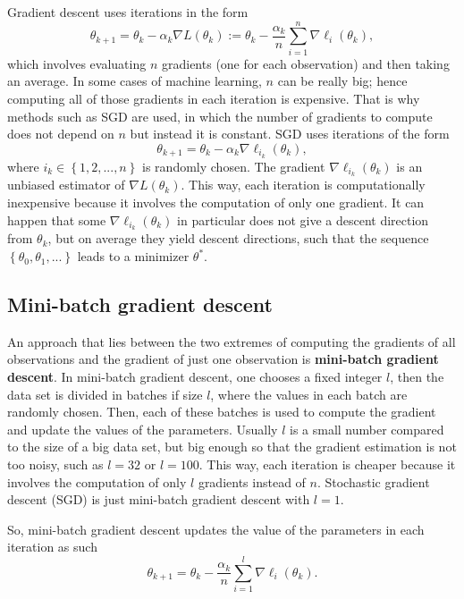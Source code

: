 Gradient descent uses iterations in the form
\begin{equation}
  \theta_{k+1} = \theta_k - \alpha_k \nabla L(\theta_k) :=\theta_k - \frac{\alpha_k}{n} \sum_{i = 1}^n \nabla \ell_i(\theta_k),
\end{equation}
which involves evaluating $n$ gradients (one for each observation) and then taking an average. In some cases of machine learning, $n$ can be really big; hence computing all of those gradients in each iteration is expensive. That is why methods such as SGD are used, in which the number of gradients to compute does not depend on $n$ but instead it is constant. SGD uses iterations of the form
\begin{equation}
  \theta_{k+1} = \theta_k - \alpha_k \nabla \ell_{i_k}(\theta_k),
\end{equation}
where $i_k \in \left\{1, 2, ..., n \right\}$ is randomly chosen. The gradient $\nabla \ell_{i_k}(\theta_k)$ is an unbiased estimator of $\nabla L(\theta_k)$. This way, each iteration is computationally inexpensive because it involves the computation of only one gradient. It can happen that some $\nabla \ell_{i_k}(\theta_k)$ in particular does not give a descent direction from $\theta_k$, but on average they yield descent directions, such that the sequence $\left\{ \theta_0, \theta_1, ... \right\}$ leads to a minimizer $\theta^*$.

\subsection{Mini-batch gradient descent}

An approach that lies between the two extremes of computing the gradients of all observations and the gradient of just one observation is \textbf{mini-batch gradient descent}. In mini-batch gradient descent, one chooses a fixed integer $l$, then the data set is divided in batches if size $l$, where the values in each batch are randomly chosen. Then, each of these batches is used to compute the gradient and update the values of the parameters. Usually $l$ is a small number compared to the size of a big data set, but big enough so that the gradient estimation is not too noisy, such as $l = 32$ or $l = 100$. This way, each iteration is cheaper because it involves the computation of only $l$ gradients instead of $n$. Stochastic gradient descent (SGD) is just mini-batch gradient descent with $l = 1$.

So, mini-batch gradient descent updates the value of the parameters in each iteration as such
\begin{equation}
  \theta_{k+1} = \theta_k - \frac{\alpha_k}{n} \sum_{i = 1}^l \nabla \ell_i(\theta_k).
\end{equation}

